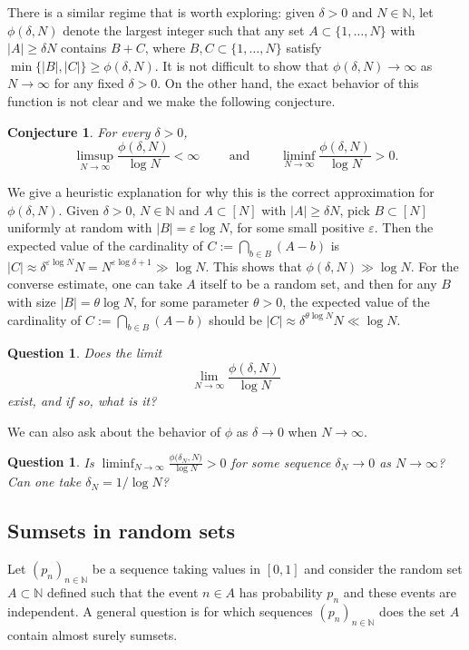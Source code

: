 \documentclass[10pt,dvipsnames]{article}
\newtheorem{conjecture}[theorem]{Conjecture}
\newtheorem{question}[theorem]{Question}
\theoremstyle{definition}
\theoremstyle{plain}
\newcommand{\N}{\mathbb{N}}
\begin{document}
There is a similar regime that is worth exploring: given $\delta>0$ and $N\in\N$, let $\phi(\delta,N)$ denote the largest integer such that any set $A\subset\{1,\ldots,N\}$ with $|A|\geq \delta N$ contains $B+C$, where $B,C\subset\{1,\ldots,N\}$ satisfy $\min\{|B|,|C|\}\geq \phi(\delta,N)$.
It is not difficult to show that $\phi(\delta,N)\to\infty$ as $N\to\infty$ for any fixed $\delta>0$. On the other hand, the exact behavior of this function is not clear and we make the following conjecture. 
\begin{conjecture}\label{conjecture_phiislog}
For every $\delta>0$,
\[
\limsup_{N\to\infty}\frac{\phi(\delta,N)}{\log N}<\infty\qquad\text{ and }\qquad\liminf_{N\to\infty}\frac{\phi(\delta,N)}{\log N}>0.
\]  
\end{conjecture}
We give a heuristic explanation for why this is the correct approximation for $\phi(\delta,N)$.
Given $\delta>0$, $N\in\N$ and $A\subset[N]$ with $|A|\geq\delta N$, pick $B\subset[N]$ uniformly at random with $|B|=\varepsilon\log N$, for some small positive $\varepsilon$.
    Then the expected value of the cardinality of $C:=\bigcap_{b\in B}(A-b)$ is $|C|\approx\delta^{\varepsilon\log N}N=N^{\varepsilon\log\delta+1}\gg\log N$.
    This shows that $\phi(\delta,N)\gg\log N$.
For the converse estimate, one can take $A$ itself to be a random set, and then for any $B$ with size $|B|=\theta\log N$, for some parameter $\theta>0$, the expected value of the cardinality of $C:=\bigcap_{b\in B}(A-b)$ should be $|C|\approx\delta^{\theta\log N}N\ll\log N$.

    

\begin{question}
Does the limit
\[
\lim_{N\to\infty}\frac{\phi(\delta,N)}{\log N}
\]
exist, and if so, what is it?
\end{question}

We can also ask about the behavior of $\phi$ as $\delta\to0$ when  $N\to\infty$.
\begin{question}
    Is $\displaystyle\liminf_{N\to\infty}\frac{\phi\big(\delta_N,N\big)}{\log N}>0$ for some sequence $\delta_N\to0$ as $N\to\infty$?
    Can one take $\delta_N=1/\log N$?
\end{question}




\subsection{Sumsets in random sets}

Let $(p_n)_{n\in\N}$ be a sequence taking values in $[0,1]$ and consider the random set $A\subset\N$ defined such that the event $n\in A$ has probability $p_n$ and these events are independent.
A general question is for which sequences $(p_n)_{n\in\N}$ does the set $A$ contain almost surely sumsets.
\end{document}
